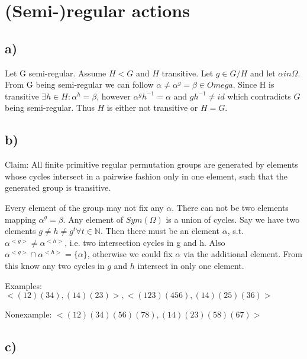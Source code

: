 \section{(Semi-)regular actions}

\subsection*{a)}
Let G semi-regular. Assume $H < G$ and $H$ transitive. Let $g \in G/H$ and let $\alpha in \Omega$. From G being semi-regular we can follow $\alpha \neq \alpha^g = \beta \in Omega$. Since H is transitive $\exists h \in H:\alpha^h=\beta$, however $\alpha^gh^{-1}=\alpha$ and $gh^{-1} \neq id$ which contradicts $G$ being semi-regular. Thus $H$ is either not transitive or $H=G$.

\subsection*{b)}
Claim: All finite primitive regular permutation groups are generated by elements whose cycles intersect in a pairwise fashion only in one element, such that the generated group is transitive.

Every element of the group may not fix any $\alpha$. There can not be two elements mapping $\alpha^g=\beta$. Any element of $Sym(\Omega)$ is a union of cycles. Say we have two elements $g \neq h \neq g^t \forall t \in \mathbb{N}$. Then there must be an element $\alpha$, s.t. $\alpha^{<g>} \neq \alpha^{<h>}$, i.e. two intersection cycles in g and h. Also $\alpha^{<g>} \cap \alpha^{<h>} = \{\alpha\}$, otherwise we could fix $\alpha$ via the additional element. From this know any two cycles in $g$ and $h$ intersect in only one element.

Examples: $<(12)(34),(14)(23)>, <(123)(456),(14)(25)(36)>$

Nonexample: $<(12)(34)(56)(78),(14)(23)(58)(67)>$

\subsection*{c)}